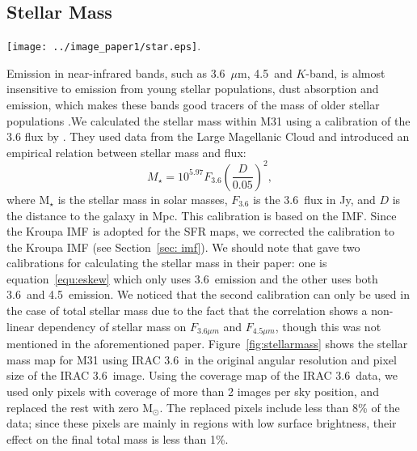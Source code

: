 \subsection{Stellar Mass}
\label{sec:starmass}
\begin{figure*}
\centering
\texttt{[image: ../image\_paper1/star.eps]}.
\caption{The stellar mass surface density map produced using IRAC 3.6~$\mu$m data and the calibration presented in equation~\ref{equ:eskew}.}
\label{fig:stellarmass}
\end{figure*}

Emission in near-infrared bands, such as 3.6~$\mu$m, 4.5~\um and $K$-band, is almost insensitive to emission from young stellar populations, dust absorption and emission, which makes these bands good tracers of the mass of older stellar populations \citep[e.g.][]{Elmgreen84, Eskew12, Zhu10}.We calculated the stellar mass within M31 using a calibration of the 3.6 \um flux by \citet{Eskew12}. They used data from the Large Magellanic Cloud and introduced an empirical relation between stellar mass and flux:
\begin{equation}
\label{equ:eskew}
M _{\star}= 10^{5.97} F_{3.6}\left(\frac{D}{0.05}\right)^2,
\end{equation}
\noindent where M$_{\star}$ is the stellar mass in solar masses, $F_{3.6}$ is the 3.6~\um flux in Jy, and $D$ is the distance to the galaxy in Mpc. This calibration is based on the \citet{Salpeter55} IMF. Since the Kroupa IMF is adopted for the SFR maps, we corrected the calibration to the Kroupa IMF (see Section~\ref{sec: imf}). We should note that \citet{Eskew12} gave two calibrations for calculating the stellar mass in their paper: one is equation~\ref{equ:eskew} which only uses 3.6~\um emission and the other uses both 3.6~\um and 4.5~\um emission. We noticed that the second calibration can only be used in the case of total stellar mass due to the fact that the correlation shows a non-linear dependency of stellar mass on $F_{3.6 \mu m}$ and $F_{4.5 \mu m}$, though this was not mentioned in the aforementioned paper. 
Figure~\ref{fig:stellarmass} shows the stellar mass map for M31 using IRAC 3.6~\um in the original angular resolution and pixel size of the IRAC 3.6~\um image. Using the coverage map of the IRAC 3.6~\um data, we used only pixels with coverage of more than 2 images per sky position, and replaced the rest with zero M$_{\odot}$. The replaced pixels include less than 8\% of the data;  since these pixels are mainly  in regions with low surface brightness, their effect on the final total mass is less than 1\%.

